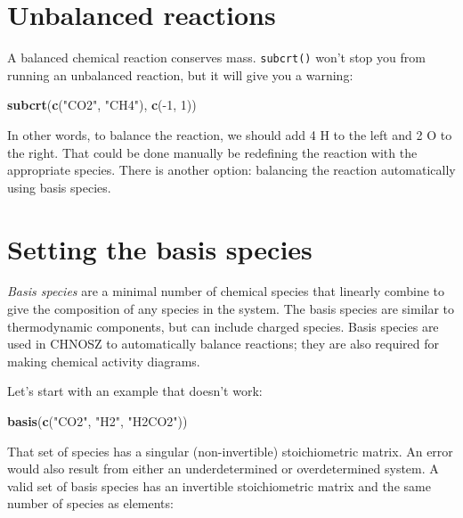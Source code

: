 \documentclass[]{tufte-book}
\newenvironment{Shaded}{}{}
\newcommand{\KeywordTok}[1]{\textcolor[rgb]{0.00,0.44,0.13}{\textbf{#1}}}
\newcommand{\DecValTok}[1]{\textcolor[rgb]{0.25,0.63,0.44}{#1}}
\newcommand{\StringTok}[1]{\textcolor[rgb]{0.25,0.44,0.63}{#1}}
\newcommand{\OperatorTok}[1]{\textcolor[rgb]{0.40,0.40,0.40}{#1}}
\newcommand{\NormalTok}[1]{#1}
\begin{document}
\section{Unbalanced reactions}\label{unbalanced-reactions}

A balanced chemical reaction conserves mass. {\texttt{subcrt()}} won't
stop you from running an unbalanced reaction, but it will give you a
warning:

\begin{Shaded}
\begin{Highlighting}[]
\KeywordTok{subcrt}\NormalTok{(}\KeywordTok{c}\NormalTok{(}\StringTok{"CO2"}\NormalTok{, }\StringTok{"CH4"}\NormalTok{), }\KeywordTok{c}\NormalTok{(}\OperatorTok{-}\DecValTok{1}\NormalTok{, }\DecValTok{1}\NormalTok{))}
\end{Highlighting}
\end{Shaded}

In other words, to balance the reaction, we should add 4 H to the left
and 2 O to the right. That could be done manually be redefining the
reaction with the appropriate species. There is another option:
balancing the reaction automatically using basis species.

\section{Setting the basis species}\label{setting-the-basis-species}

\emph{Basis species} are a minimal number of chemical species that
linearly combine to give the composition of any species in the system.
The basis species are similar to thermodynamic components, but can
include charged species. Basis species are used in CHNOSZ to
automatically balance reactions; they are also required for making
chemical activity diagrams.

Let's start with an example that doesn't work:

\begin{Shaded}
\begin{Highlighting}[]
\KeywordTok{basis}\NormalTok{(}\KeywordTok{c}\NormalTok{(}\StringTok{"CO2"}\NormalTok{, }\StringTok{"H2"}\NormalTok{, }\StringTok{"H2CO2"}\NormalTok{))}
\end{Highlighting}
\end{Shaded}

That set of species has a singular (non-invertible) stoichiometric
matrix. An error would also result from either an underdetermined or
overdetermined system. A valid set of basis species has an invertible
stoichiometric matrix and the same number of species as elements:
\end{document}
